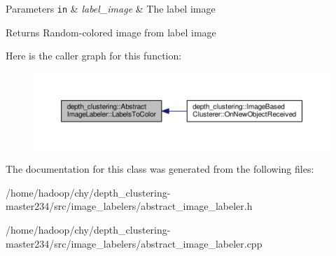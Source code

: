 \begin{DoxyParams}[1]{Parameters}
\mbox{\tt in}  & {\em label\-\_\-image} & The label image\\
\hline
\end{DoxyParams}
\begin{DoxyReturn}{Returns}
Random-\/colored image from label image 
\end{DoxyReturn}


Here is the caller graph for this function\-:
\nopagebreak
\begin{figure}[H]
\begin{center}
\leavevmode
\includegraphics[width=350pt]{classdepth__clustering_1_1AbstractImageLabeler_abab18e0c1ca40b54922a2f21948b996b_icgraph}
\end{center}
\end{figure}




The documentation for this class was generated from the following files\-:\begin{DoxyCompactItemize}
\item 
/home/hadoop/chy/depth\-\_\-clustering-\/master234/src/image\-\_\-labelers/abstract\-\_\-image\-\_\-labeler.\-h\item 
/home/hadoop/chy/depth\-\_\-clustering-\/master234/src/image\-\_\-labelers/abstract\-\_\-image\-\_\-labeler.\-cpp\end{DoxyCompactItemize}

